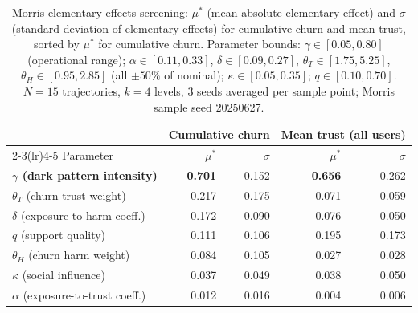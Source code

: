 \begin{table}[!t]
\centering
\caption{Morris elementary-effects screening: $\mu^*$ (mean absolute elementary effect)
and $\sigma$ (standard deviation of elementary effects) for cumulative churn and mean trust,
sorted by $\mu^*$ for cumulative churn.
Parameter bounds: $\gamma\in[0.05,0.80]$ (operational range);
$\alpha\in[0.11,0.33]$, $\delta\in[0.09,0.27]$, $\theta_T\in[1.75,5.25]$,
$\theta_H\in[0.95,2.85]$ (all $\pm50\%$ of nominal);
$\kappa\in[0.05,0.35]$; $q\in[0.10,0.70]$.
$N=15$ trajectories, $k=4$ levels, 3 seeds averaged per sample point;
Morris sample seed 20250627.}
\label{tab:morris}
\small
\begin{tabular}{lrrrr}
\toprule
 & \multicolumn{2}{c}{Cumulative churn} & \multicolumn{2}{c}{Mean trust (all users)} \\
\cmidrule(lr){2-3}\cmidrule(lr){4-5}
Parameter & $\mu^*$ & $\sigma$ & $\mu^*$ & $\sigma$ \\
\midrule
\textbf{$\gamma$ (dark pattern intensity)} & \textbf{0.701} & 0.152 & \textbf{0.656} & 0.262 \\
$\theta_T$ (churn trust weight)            & 0.217          & 0.175 & 0.071          & 0.059 \\
$\delta$ (exposure-to-harm coeff.)         & 0.172          & 0.090 & 0.076          & 0.050 \\
$q$ (support quality)                      & 0.111          & 0.106 & 0.195          & 0.173 \\
$\theta_H$ (churn harm weight)             & 0.084          & 0.105 & 0.027          & 0.028 \\
$\kappa$ (social influence)                & 0.037          & 0.049 & 0.038          & 0.050 \\
$\alpha$ (exposure-to-trust coeff.)        & 0.012          & 0.016 & 0.004          & 0.006 \\
\bottomrule
\end{tabular}
\end{table}
